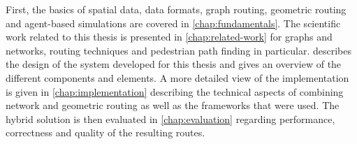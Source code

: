 	First, the basics of spatial data, data formats, graph routing, geometric routing and agent-based simulations are covered in \cref{chap:fundamentals}.
	The scientific work related to this thesis is presented in \cref{chap:related-work} for graphs and networks, routing techniques and pedestrian path finding in particular.
	 describes the design of the system developed for this thesis and gives an overview of the different components and elements.
	A more detailed view of the implementation is given in \cref{chap:implementation} describing the technical aspects of combining network and geometric routing as well as the frameworks that were used.
	The hybrid solution is then evaluated in \cref{chap:evaluation} regarding performance, correctness and quality of the resulting routes.
	
